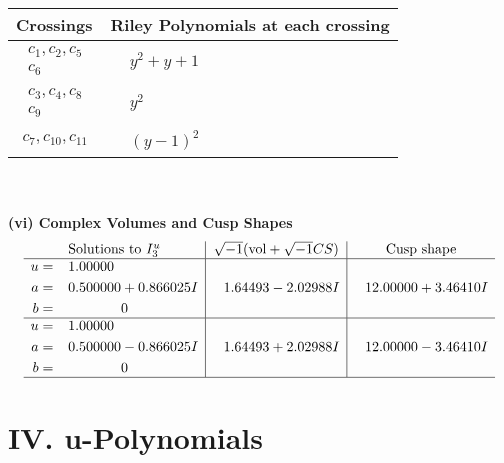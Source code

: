 \documentclass[1p]{elsarticle_modified}
\theoremstyle{definition}
\newcommand{\I}{\sqrt{-1}}
\begin{document}
\begin{tabular}{m{50pt}|m{274pt}}
Crossings & \hspace{64pt}Riley Polynomials at each crossing \\
\hline $$\begin{aligned}c_{1},c_{2},c_{5}\\c_{6}\end{aligned}$$&$\begin{aligned}
&y^2+y+1
\end{aligned}$\\
\hline $$\begin{aligned}c_{3},c_{4},c_{8}\\c_{9}\end{aligned}$$&$\begin{aligned}
&y^2
\end{aligned}$\\
\hline $$\begin{aligned}c_{7},c_{10},c_{11}\end{aligned}$$&$\begin{aligned}
&(y-1)^2
\end{aligned}$\\
\hline
\end{tabular}\\~\\
\newpage\flushleft \textbf{(vi) Complex Volumes and Cusp Shapes}
$$\begin{array}{c|c|c}  
\text{Solutions to }I^u_{3}& \I (\text{vol} + \sqrt{-1}CS) & \text{Cusp shape}\\
 \hline 
\begin{aligned}
u &= \phantom{-}1.00000\phantom{ +0.000000I} \\
a &= \phantom{-}0.500000 + 0.866025 I \\
b &= \phantom{-0.000000 } 0\end{aligned}
 & \phantom{-}1.64493 - 2.02988 I & \phantom{-}12.00000 + 3.46410 I \\ \hline\begin{aligned}
u &= \phantom{-}1.00000\phantom{ +0.000000I} \\
a &= \phantom{-}0.500000 - 0.866025 I \\
b &= \phantom{-0.000000 } 0\end{aligned}
 & \phantom{-}1.64493 + 2.02988 I & \phantom{-}12.00000 - 3.46410 I\\
 \hline 
 \end{array}$$\newpage
\newpage\renewcommand{\arraystretch}{1}
\centering \section*{ IV. u-Polynomials}
\end{document}
